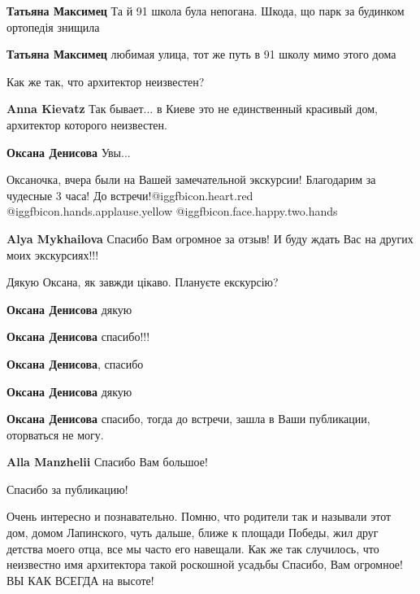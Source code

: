 \begin{itemize}
\begin{itemize}
\textbf{Татьяна Максимец} Та й 91 школа була непогана. Шкода, що парк за будинком ортопедія знищила

\textbf{Татьяна Максимец} любимая улица, тот же путь в 91 школу мимо этого дома

\end{itemize} %

Как же так, что архитектор неизвестен?

\begin{itemize} %
\textbf{Anna Kievatz} Так бывает... в Киеве это не единственный красивый дом, архитектор которого неизвестен.

\textbf{Оксана Денисова} Увы...
\end{itemize} %

Оксаночка, вчера были на Вашей замечательной экскурсии! Благодарим за чудесные 3 часа! До встречи!@igg{fbicon.heart.red} @igg{fbicon.hands.applause.yellow}  @igg{fbicon.face.happy.two.hands} 

\textbf{Alya Mykhailova} Спасибо Вам огромное за отзыв! И буду ждать Вас на других моих экскурсиях!!!

Дякую Оксана, як завжди цікаво. Плануєте екскурсію?

\begin{itemize} %
\textbf{Оксана Денисова} дякую

\textbf{Оксана Денисова} спасибо!!!

\textbf{Оксана Денисова}, спасибо

\textbf{Оксана Денисова} дякую

\textbf{Оксана Денисова} спасибо, тогда до встречи, зашла в Ваши публикации, оторваться не могу.

\textbf{Alla Manzhelii} Спасибо Вам большое!
\end{itemize} %

Спасибо за публикацию!


Очень интересно и познавательно. Помню, что родители так и называли этот дом,
домом Лапинского, чуть дальше, ближе к площади Победы, жил друг детства моего
отца, все мы часто его навещали. Как же так случилось, что неизвестно имя
архитектора такой роскошной усадьбы Спасибо, Вам огромное! ВЫ КАК ВСЕГДА на
высоте!


\end{itemize}
